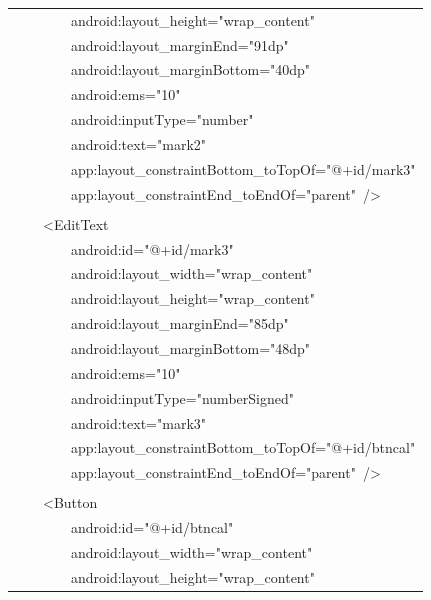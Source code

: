 \documentclass[a4paper,12pt]{article}
\begin{document}
\begin{longtable}{|p{}|}
{\ttfamily\small \ \ \ \ \ \ \ \ android:layout\_height="wrap\_content"} \\
{\ttfamily\small \ \ \ \ \ \ \ \ android:layout\_marginEnd="91dp"} \\
{\ttfamily\small \ \ \ \ \ \ \ \ android:layout\_marginBottom="40dp"} \\
{\ttfamily\small \ \ \ \ \ \ \ \ android:ems="10"} \\
{\ttfamily\small \ \ \ \ \ \ \ \ android:inputType="number"} \\
{\ttfamily\small \ \ \ \ \ \ \ \ android:text="mark2"} \\
{\ttfamily\small \ \ \ \ \ \ \ \ app:layout\_constraintBottom\_toTopOf="@+id/mark3"} \\
{\ttfamily\small \ \ \ \ \ \ \ \ app:layout\_constraintEnd\_toEndOf="parent"\ /\textgreater{}} \\
\strut \\
{\ttfamily\small \ \ \ \ \textless{}EditText} \\
{\ttfamily\small \ \ \ \ \ \ \ \ android:id="@+id/mark3"} \\
{\ttfamily\small \ \ \ \ \ \ \ \ android:layout\_width="wrap\_content"} \\
{\ttfamily\small \ \ \ \ \ \ \ \ android:layout\_height="wrap\_content"} \\
{\ttfamily\small \ \ \ \ \ \ \ \ android:layout\_marginEnd="85dp"} \\
{\ttfamily\small \ \ \ \ \ \ \ \ android:layout\_marginBottom="48dp"} \\
{\ttfamily\small \ \ \ \ \ \ \ \ android:ems="10"} \\
{\ttfamily\small \ \ \ \ \ \ \ \ android:inputType="numberSigned"} \\
{\ttfamily\small \ \ \ \ \ \ \ \ android:text="mark3"} \\
{\ttfamily\small \ \ \ \ \ \ \ \ app:layout\_constraintBottom\_toTopOf="@+id/btncal"} \\
{\ttfamily\small \ \ \ \ \ \ \ \ app:layout\_constraintEnd\_toEndOf="parent"\ /\textgreater{}} \\
\strut \\
{\ttfamily\small \ \ \ \ \textless{}Button} \\
{\ttfamily\small \ \ \ \ \ \ \ \ android:id="@+id/btncal"} \\
{\ttfamily\small \ \ \ \ \ \ \ \ android:layout\_width="wrap\_content"} \\
{\ttfamily\small \ \ \ \ \ \ \ \ android:layout\_height="wrap\_content"} \\

\end{longtable}
\end{document}
